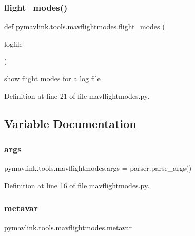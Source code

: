 \subsubsection{\texorpdfstring{flight\_modes()}{flight\_modes()}}
{\footnotesize\ttfamily def pymavlink.\+tools.\+mavflightmodes.\+flight\+\_\+modes (\begin{DoxyParamCaption}\item[{}]{logfile }\end{DoxyParamCaption})}

\begin{DoxyVerb}show flight modes for a log file\end{DoxyVerb}
 

Definition at line 21 of file mavflightmodes.\+py.



\subsection{Variable Documentation}
\mbox{\label{namespacepymavlink_1_1tools_1_1mavflightmodes_a5381f7691451a113ba563a0d769c3352}} 
\subsubsection{\texorpdfstring{args}{args}}
{\footnotesize\ttfamily pymavlink.\+tools.\+mavflightmodes.\+args = parser.\+parse\+\_\+args()}



Definition at line 16 of file mavflightmodes.\+py.

\mbox{\label{namespacepymavlink_1_1tools_1_1mavflightmodes_a3f6cc982384aa9be3c7f21553c53fa2e}} 
\subsubsection{\texorpdfstring{metavar}{metavar}}
{\footnotesize\ttfamily pymavlink.\+tools.\+mavflightmodes.\+metavar}



